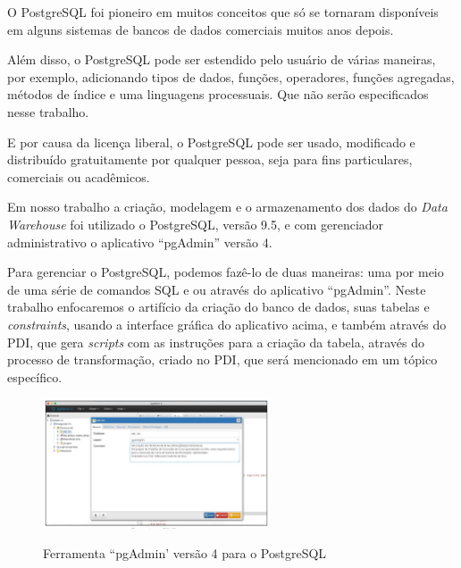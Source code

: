 O PostgreSQL foi pioneiro em muitos conceitos que s\'{o} se tornaram dispon\'{i}veis em alguns sistemas de bancos de dados comerciais muitos anos depois.

Al\'{e}m disso, o PostgreSQL pode ser estendido pelo usu\'{a}rio de v\'{a}rias maneiras, por exemplo, 
adicionando tipos de dados, fun\c{c}\~{o}es, operadores, fun\c{c}\~{o}es agregadas, m\'{e}todos de \'{i}ndice e uma linguagens processuais. Que n\~{a}o ser\~{a}o especificados nesse trabalho.

E por causa da licen\c{c}a liberal, o PostgreSQL pode ser usado, modificado e distribu\'{i}do gratuitamente por 
qualquer pessoa, seja para fins particulares, comerciais ou acadêmicos.

Em nosso trabalho a cria\c{c}\~{a}o, modelagem e o armazenamento dos dados do \textit{Data Warehouse} foi 
utilizado o PostgreSQL, vers\~{a}o 9.5, e com gerenciador administrativo o aplicativo ``pgAdmin'' vers\~{a}o 4. 

Para gerenciar o PostgreSQL, podemos faz\^{e}-lo de duas maneiras: uma por meio de uma 
s\'{e}rie de comandos SQL e ou atrav\'{e}s do aplicativo ``pgAdmin''. Neste trabalho enfocaremos o artif\'{i}cio da cria\c{c}\~{a}o do banco de dados, suas tabelas e \textit{constraints}, usando a interface gr\'{a}fica do aplicativo acima, e tamb\'{e}m atrav\'{e}s do PDI, que gera \textit{scripts} com as instru\c{c}\~{o}es para a cria\c{c}\~{a}o da tabela, atrav\'{e}s do processo de transforma\c{c}\~{a}o, criado no PDI, que ser\'{a} mencionado em um t\'opico espec\'{i}fico.

\begin{figure}[H]
	\vspace*{0,2cm}
    \centering
    \caption{Ferramenta ``pgAdmin' vers\~{a}o 4 para o PostgreSQL}
    \includegraphics[width=0.6\textwidth]{./04-figuras/figura-14}
    \label{fig:ilustfig14}
\end{figure}
\vspace*{-0,9cm}
{\raggedright {}} \\

